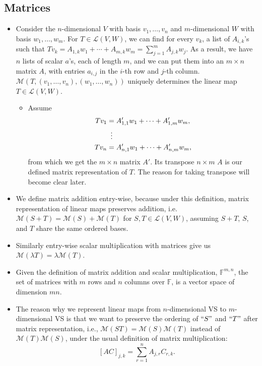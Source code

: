 \documentclass{article}
\newcommand{\F}{\mathbb{F}}
\newcommand{\LVW}{\mathcal{L}(V,W)}
\newcommand{\M}{\mathcal{M}}
\newcommand{\bv}{v_1,\dots,v_n}
\newcommand{\bw}{w_1,\dots,w_n}
\begin{document}
\subsection{Matrices}
\begin{itemize}
    \item Consider the $n$-dimensional $V$ with basis $\bv$ and $m$-dimensional $W$ with basis $w_1,\dots,w_m$. For $T \in \LVW$, we can find for every $v_k$, a list of $A_{i,k}$'s such that $Tv_k = A_{1,k}w_1 +\cdots+ A_{m,k}w_m = \sum_{j=1}^m A_{j,k}w_j$. As a result, we have $n$ lists of scalar $a$'s, each of length $m$, and we can put them into an $m \times n$ matrix $A$, with entries $a_{i,j}$ in the $i$-th row and $j$-th column. $\mathcal{M}(T,(\bv),(\bw))$ uniquely determines the linear map $T \in \LVW$.
    \begin{itemize}
        \item Assume
        \begin{align*}
            Tv_1 & = A'_{1,1} w_1 + \dots + A'_{1,m} w_m, \\
            & \vdotswithin{=} \\
            Tv_n & = A'_{n,1} w_1 + \dots + A'_{n,m} w_m,
        \end{align*}
        from which we get the $m \times n$ matrix $A'$. Its transpose $n \times m$ $A$ is our defined matrix representation of $T$. The reason for taking transpose will become clear later.
    \end{itemize}
    \item We define matrix addition entry-wise, because under this definition, matrix representation of linear maps preserves addition, i.e. $\M(S+T) = \M(S) + \M(T)$ for $S,T \in \LVW$, assuming $S+T$, $S$, and $T$ share the same ordered bases.
    \item Similarly entry-wise scalar multiplication with matrices give us $\M(\lambda T) = \lambda \M(T)$.
    \item Given the definition of matrix addition and scalar multiplication, $\F^{m,n}$, the set of matrices with $m$ rows and $n$ columns over $\F$, is a vector space of dimension $mn$.
    \item The reason why we represent linear maps from $n$-dimensional VS to $m$-dimensional VS is that we want to preserve the ordering of $``S"$ and $``T"$ after matrix representation, i.e., $\M(ST) = \M(S)\M(T)$ instead of $\M(T)\M(S)$, under the usual definition of matrix multiplication: $$[AC]_{j,k} = \sum_{r = 1}^n A_{j,r}C_{r,k}.$$
    \begin{itemize}

\end{itemize}
\end{itemize}
\end{document}
